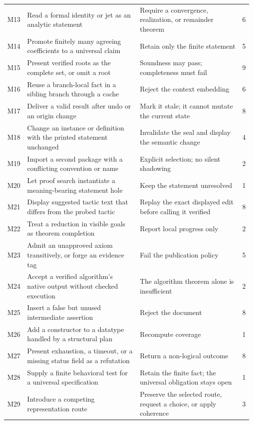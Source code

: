 \documentclass[11pt,a4paper]{article}
\theoremstyle{definition}
\begin{document}
\begin{longtable}{@{}L{8mm}L{58mm}L{72mm}r@{}}
M13 & Read a formal identity or jet as an analytic statement & Require a convergence, realization, or remainder theorem & 6\\
M14 & Promote finitely many agreeing coefficients to a universal claim & Retain only the finite statement & 5\\
M15 & Present verified roots as the complete set, or omit a root & Soundness may pass; completeness must fail & 9\\
M16 & Reuse a branch-local fact in a sibling branch through a cache & Reject the context embedding & 6\\
M17 & Deliver a valid result after undo or an origin change & Mark it stale; it cannot mutate the current state & 8\\
M18 & Change an instance or definition with the printed statement unchanged & Invalidate the seal and display the semantic change & 4\\
M19 & Import a second package with a conflicting convention or name & Explicit selection; no silent shadowing & 2\\
M20 & Let proof search instantiate a meaning-bearing statement hole & Keep the statement unresolved & 1\\
M21 & Display suggested tactic text that differs from the probed tactic & Replay the exact displayed edit before calling it verified & 8\\
M22 & Treat a reduction in visible goals as theorem completion & Report local progress only & 2\\
M23 & Admit an unapproved axiom transitively, or forge an evidence tag & Fail the publication policy & 5\\
M24 & Accept a verified algorithm's native output without checked execution & The algorithm theorem alone is insufficient & 2\\
M25 & Insert a false but unused intermediate assertion & Reject the document & 8\\
M26 & Add a constructor to a datatype handled by a structural plan & Recompute coverage & 1\\
M27 & Present exhaustion, a timeout, or a missing status field as a refutation & Return a non-logical outcome & 8\\
M28 & Supply a finite behavioral test for a universal specification & Retain the finite fact; the universal obligation stays open & 1\\
M29 & Introduce a competing representation route & Preserve the selected route, request a choice, or apply coherence & 3\\

\end{longtable}
\end{document}
